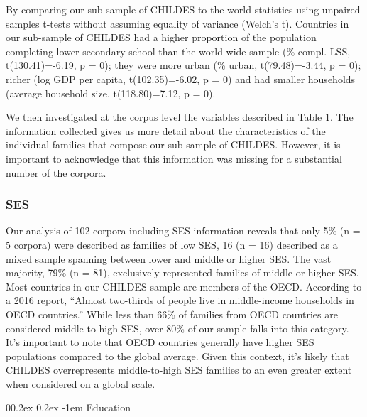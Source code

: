 \documentclass[
  man,floatsintext]{apa6}
\makeatletter
\let\oldparagraph\paragraph
\renewcommand{\paragraph}[1]{\oldparagraph{#1}\mbox{}}
\renewcommand{\paragraph}{\@startsection{paragraph}{4}{\parindent}%
  {0\baselineskip \@plus 0.2ex \@minus 0.2ex}%
  {-1em}%
  {\normalfont\normalsize\bfseries\itshape\typesectitle}}
\makeatother
\begin{document}
By comparing our sub-sample of CHILDES to the world statistics using unpaired samples t-tests without assuming equality of variance (Welch's t). Countries in our sub-sample of CHILDES had a higher proportion of the population completing lower secondary school than the world wide sample (\% compl. LSS, t(130.41)=-6.19, p = 0); they were more urban (\% urban, t(79.48)=-3.44, p = 0); richer (log GDP per capita, t(102.35)=-6.02, p = 0) and had smaller households (average household size, t(118.80)=7.12, p = 0).

We then investigated at the corpus level the variables described in Table 1. The information collected gives us more detail about the characteristics of the individual families that compose our sub-sample of CHILDES. However, it is important to acknowledge that this information was missing for a substantial number of the corpora.

\hypertarget{ses}{%
\subsubsection{SES}\label{ses}}

Our analysis of 102 corpora including SES information reveals that only 5\% (n = 5 corpora) were described as families of low SES, 16 (n = 16) described as a mixed sample spanning between lower and middle or higher SES. The vast majority, 79\% (n = 81), exclusively represented families of middle or higher SES.
Most countries in our CHILDES sample are members of the OECD. According to a 2016 report, ``Almost two-thirds of people live in middle-income households in OECD countries.'' While less than 66\% of families from OECD countries are considered middle-to-high SES, over 80\% of our sample falls into this category.
It's important to note that OECD countries generally have higher SES populations compared to the global average. Given this context, it's likely that CHILDES overrepresents middle-to-high SES families to an even greater extent when considered on a global scale.

\hypertarget{education}{%
\paragraph{Education}\label{education}}
\end{document}
